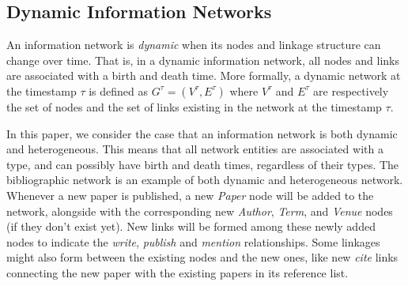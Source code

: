 \subsection{Dynamic Information Networks}
An information network is \emph{dynamic} when its nodes and linkage structure can change over time. That is, in a dynamic information network, all nodes and links are associated with a birth and death time. More formally, a dynamic network at the timestamp $\tau$ is defined as $G^{\tau}=(V^{\tau}, E^{\tau})$ where $V^{\tau}$ and $E^{\tau}$ are respectively the set of nodes and the set of links existing in the network at the timestamp $\tau$.

In this paper, we consider the case that an information network is both dynamic and heterogeneous. This means that all network entities are associated with a type, and can possibly have birth and death times, regardless of their types. The bibliographic network is an example of both dynamic and heterogeneous network. Whenever a new paper is published, a new \emph{Paper} node will be added to the network, alongside with the corresponding new \emph{Author}, \emph{Term}, and \emph{Venue} nodes (if they don't exist yet). New links will be formed among these newly added nodes to indicate the \textit{write}, \textit{publish} and \textit{mention} relationships. Some linkages might also form between the existing nodes and the new ones, like new \textit{cite} links connecting the new paper with the existing papers in its reference list.

